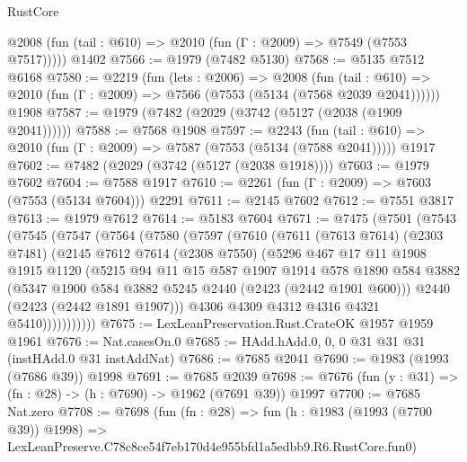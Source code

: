 \begin{lexlean}{RustCore}
\begin{coremodule}
      @2008 (fun (tail : @610) => @2010 (fun (Γ : @2009) => @7549 (@7553 @7517)))))
    @1402
@7566 := @1979 (@7482 @5130)
@7568 := @5135 @7512 @6168
@7580 := @2219
    (fun (lets : @2006) =>
    @2008
      (fun (tail : @610) => @2010 (fun (Γ : @2009) => @7566 (@7553 (@5134 (@7568 @2039 @2041))))))
    @1908
@7587 := @1979 (@7482 (@2029 (@3742 (@5127 (@2038 (@1909 @2041))))))
@7588 := @7568 @1908
@7597 := @2243
    (fun (tail : @610) => @2010 (fun (Γ : @2009) => @7587 (@7553 (@5134 (@7588 @2041)))))
    @1917
@7602 := @7482 (@2029 (@3742 (@5127 (@2038 @1918))))
@7603 := @1979 @7602
@7604 := @7588 @1917
@7610 := @2261 (fun (Γ : @2009) => @7603 (@7553 (@5134 @7604))) @2291
@7611 := @2145 @7602
@7612 := @7551 @3817
@7613 := @1979 @7612
@7614 := @5183 @7604
@7671 := @7475
    (@7501
      (@7543
        (@7545
          (@7547
            (@7564
              (@7580
                (@7597
                  (@7610
                    (@7611
                      (@7613 @7614)
                      (@2303 @7481)
                      (@2145
                        @7612
                        @7614
                        (@2308 @7550)
                        (@5296
                          @467
                          @17
                          @11
                          @1908
                          @1915
                          @1120
                          (@5215
                            @94
                            @11
                            @15
                            @587
                            @1907
                            @1914
                            @578
                            @1890
                            @584
                            @3882
                            (@5347 @1900 @584 @3882 @5245 @2440 (@2423 (@2442 @1901 @600)))
                            @2440
                            (@2423 (@2442 @1891 @1907)))
                          @4306
                          @4309
                          @4312
                          @4316
                          @4321
                          @5410)))))))))))
@7675 := LexLeanPreservation.Rust.CrateOK @1957 @1959 @1961
@7676 := Nat.casesOn.{0}
@7685 := HAdd.hAdd.{0, 0, 0} @31 @31 @31 (instHAdd.{0} @31 instAddNat)
@7686 := @7685 @2041
@7690 := @1983 (@1993 (@7686 @39)) @1998
@7691 := @7685 @2039
@7698 := @7676 (fun (y : @31) => (fn : @28) -> (h : @7690) -> @1962 (@7691 @39)) @1997
@7700 := @7685 Nat.zero
@7708 := @7698
    (fun (fn : @28) =>
    fun (h : @1983 (@1993 (@7700 @39)) @1998) =>
    LexLeanPreserve.C78c8ce54f7eb170d4e955bfd1a5edbb9.R6.RustCore.fun0)

\end{coremodule}
\end{lexlean}
